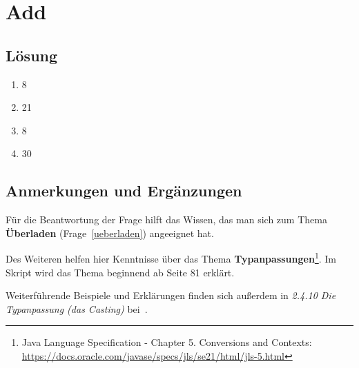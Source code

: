 \chapter{Add}

\section*{Lösung}

\begin{enumerate}
    \item 8
    \item 21
    \item 8
    \item 30
\end{enumerate}


\section*{Anmerkungen und Ergänzungen}

Für die Beantwortung der Frage hilft das Wissen, das man sich zum Thema \textbf{Überladen} (Frage~\ref{ueberladen}) angeeignet hat.

Des Weiteren helfen hier Kenntnisse über das Thema \textbf{Typanpassungen}\footnote{
    Java Language Specification - Chapter 5. Conversions and Contexts: \url{https://docs.oracle.com/javase/specs/jls/se21/html/jls-5.html}
}.
Im Skript wird das Thema beginnend ab Seite 81 erklärt.

Weiterführende Beispiele und Erklärungen finden sich außerdem in \textit{2.4.10 Die Typanpassung (das Casting)} bei~\cite[170 ff.]{Ull12}.